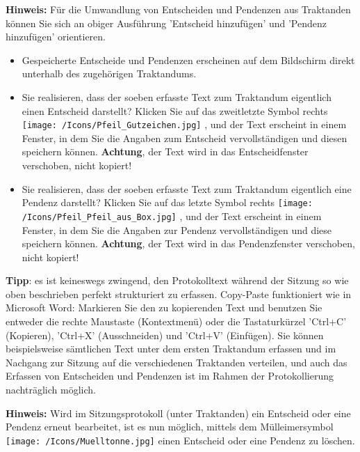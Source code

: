 \textbf{Hinweis:} Für die Umwandlung von Entscheiden und Pendenzen aus Traktanden können Sie sich an obiger Ausführung 'Entscheid hinzufügen' und 'Pendenz hinzufügen' orientieren. 

\begin{itemize}
\item
Gespeicherte Entscheide und Pendenzen erscheinen auf dem Bildschirm direkt unterhalb des zugehörigen Traktandums.
\item
Sie realisieren, dass der soeben erfasste Text zum Traktandum eigentlich einen Entscheid darstellt? Klicken Sie auf das zweitletzte Symbol rechts \texttt{[image: /Icons/Pfeil\_Gutzeichen.jpg]} , und der Text erscheint in einem Fenster, in dem Sie die Angaben zum Entscheid vervollständigen und diesen speichern können. \textbf{Achtung}, der Text wird in das Entscheidfenster verschoben, nicht kopiert!
\item
Sie realisieren, dass der soeben erfasste Text zum Traktandum eigentlich eine Pendenz darstellt? Klicken Sie auf das letzte Symbol rechts \texttt{[image: /Icons/Pfeil\_Pfeil\_aus\_Box.jpg]} , und der Text erscheint in einem Fenster, in dem Sie die Angaben zur Pendenz vervollständigen und diese speichern können. \textbf{Achtung}, der Text wird in das Pendenzfenster verschoben, nicht kopiert!
\end{itemize}


\textbf{Tipp}: es ist keineswegs zwingend, den Protokolltext während der Sitzung so wie oben beschrieben perfekt strukturiert zu erfassen. Copy-Paste funktioniert wie in Microsoft Word: Markieren Sie den zu kopierenden Text und benutzen Sie entweder die rechte Maustaste (Kontextmenü) oder die Tastaturkürzel 'Ctrl+C' (Kopieren), 'Ctrl+X' (Ausschneiden) und 'Ctrl+V' (Einfügen). Sie können beispielsweise sämtlichen Text unter dem ersten Traktandum erfassen und im Nachgang zur Sitzung auf die verschiedenen Traktanden verteilen, und auch das Erfassen von Entscheiden und Pendenzen ist im Rahmen der Protokollierung nachträglich möglich.

\vspace{\baselineskip}

\textbf{Hinweis:} Wird im Sitzungsprotokoll (unter Traktanden) ein Entscheid oder eine Pendenz erneut bearbeitet, ist es nun möglich, mittels dem Mülleimersymbol \texttt{[image: /Icons/Muelltonne.jpg]} einen Entscheid oder eine Pendenz zu löschen.

